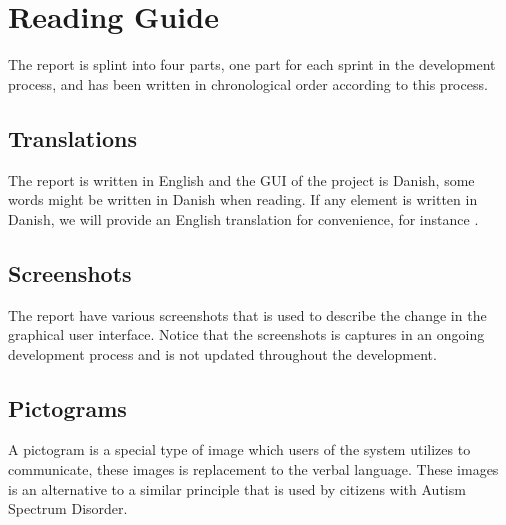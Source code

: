 
\section*{Reading Guide}
The report is splint into four parts, one part for each sprint in the development process\parencite{scrum}, and has been written in chronological order according to this process. 

\subsection*{Translations}
\label{sub:translations}
The report is written in English and the GUI of the project is Danish, some words might be written in Danish when reading. If any element is written in Danish, we will provide an English translation for convenience, for instance .

\subsection*{Screenshots}
The report have various screenshots that is used to describe the change in the graphical user interface. Notice that the screenshots is captures in an ongoing development process and is not updated throughout the development.

\subsection*{Pictograms}
A pictogram is a special type of image which users of the \giraf system utilizes to communicate, these images is replacement to the verbal language. These images is an alternative to a similar principle that is used by citizens with Autism Spectrum Disorder.  

